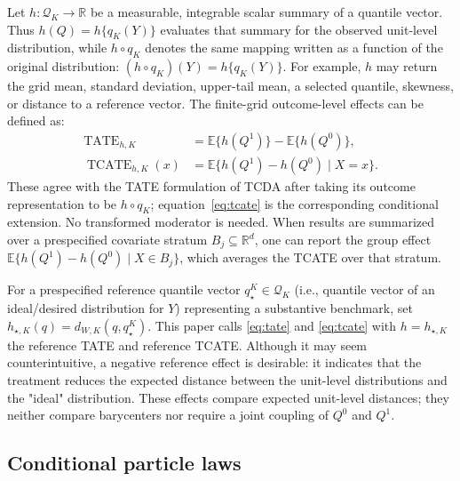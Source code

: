 \documentclass[twoside]{article}
\newcommand{\E}{\mathbb{E}}
\newcommand{\QK}{\mathcal{Q}_K}
\newcommand{\TATE}{\operatorname{TATE}}
\newcommand{\TCATE}{\operatorname{TCATE}}
\begin{document}
Let $h:\QK\rightarrow\mathbb R$ be a measurable, integrable scalar summary of a quantile vector. Thus $h(Q)=h\{q_K(Y)\}$ evaluates that summary for the observed unit-level distribution, while $h\circ q_K$ denotes the same mapping written as a function of the original distribution: $(h\circ q_K)(Y)=h\{q_K(Y)\}$. For example, $h$ may return the grid mean, standard deviation, upper-tail mean, a selected quantile, skewness, or distance to a reference vector. The finite-grid outcome-level effects can be defined as:
\begin{align}
 \TATE_{h,K}
 &=\E\{h(Q^1)\}-\E\{h(Q^0)\},\label{eq:tate}\\
 \TCATE_{h,K}(x)
 &=\E\{h(Q^1)-h(Q^0)\mid X=x\}.\label{eq:tcate}
\end{align}
These agree with the TATE formulation of TCDA \citep{souto_diamantis_tcda_2026} after taking its outcome representation to be $h\circ q_K$; equation~\eqref{eq:tcate} is the corresponding conditional extension. No transformed moderator is needed. When results are summarized over a prespecified covariate stratum $B_j\subseteq\mathbb R^d$, one can report the group effect $\E\{h(Q^1)-h(Q^0)\mid X\in B_j\}$, which averages the TCATE over that stratum. 

For a prespecified reference quantile vector $q_\star^K\in\QK$ (i.e., quantile vector of an ideal/desired distribution for $Y$) representing a substantive benchmark, set $h_{\star,K}(q)=d_{W,K}(q,q_\star^K)$. This paper calls \eqref{eq:tate} and \eqref{eq:tcate} with $h=h_{\star,K}$ the reference TATE and reference TCATE. Although it may seem counterintuitive, a negative reference effect is desirable: it indicates that the treatment reduces the expected distance between the unit-level distributions and the "ideal" distribution. These effects compare expected unit-level distances; they neither compare barycenters nor require a joint coupling of $Q^0$ and $Q^1$.

\subsection{Conditional particle laws}\label{sec:particle}
\end{document}
